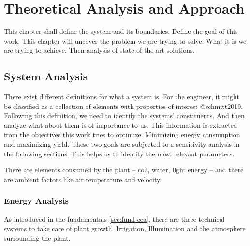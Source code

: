 \chapter{Theoretical Analysis and Approach}
\label{chap:analysis-and-arch}
This chapter shall define the system and its boundaries.
Define the goal of this work.
This chapter will uncover the problem we are trying to solve.
What it is we are trying to achieve.
Then analysis of state of the art solutions.
%
\section{System Analysis}
\label{sec:system-analysis}
There exist different definitions for what a system is.
For the engineer, it might be classified as a collection of elements with properties of interest @schmitt2019.
Following this definition, we need to identify the systems' constituents.
And then analyze what about them is of importance to us.
This information is extracted from the objectives this work tries to optimize.
Minimizing energy consumption and maximizing yield.
These two goals are subjected to a sensitivity analysis in the following sections.
This helps us to identify the most relevant parameters.


There are elements consumed by the plant -- co2, water, light energy -- and there are ambient factors like air temperature and velocity.

\subsection{Energy Analysis}
\label{sub:energy-analysis}
As introduced in the fundamentals \ref{sec:fund-cea}, there are three technical systems to take care of plant growth.
Irrigation, Illumination and the atmosphere surrounding the plant.

